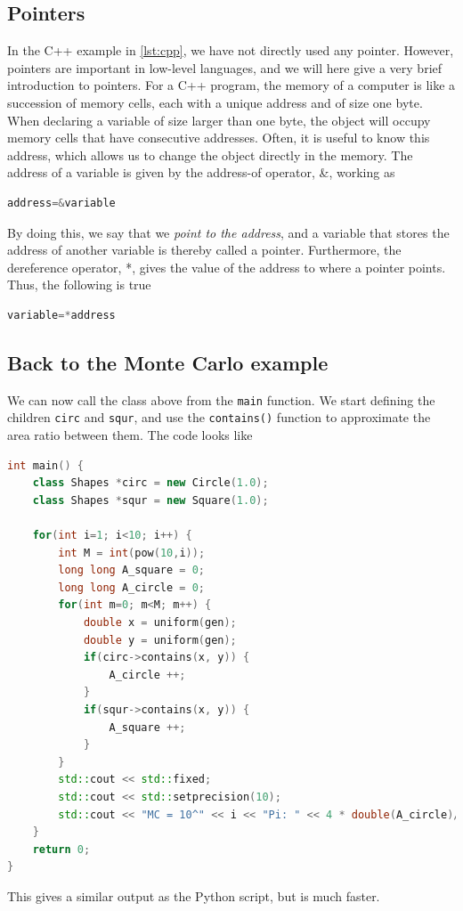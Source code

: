 \subsection{Pointers}
In the C++ example in \eqref{lst:cpp}, we have not directly used any pointer. However, pointers are important in low-level languages, and we will here give a very brief introduction to pointers. For a C++ program, the memory of a computer is like a succession of memory cells, each with a unique address and of size one byte. When declaring a variable of size larger than one byte, the object will occupy memory cells that have consecutive addresses. Often, it is useful to know this address, which allows us to change the object directly in the memory. The address of a variable is given by the address-of operator, \&, working as
\lstset{basicstyle=\scriptsize}
\begin{lstlisting}[language=C++]
address=&variable
\end{lstlisting}
By doing this, we say that we \textit{point to the address}, and a variable that stores the address of another variable is thereby called a pointer. Furthermore, the dereference operator, *, gives the value of the address to where a pointer points. Thus, the following is true
\begin{lstlisting}[language=C++]
variable=*address
\end{lstlisting}

\subsection{Back to the Monte Carlo example}
We can now call the class above from the \texttt{main} function. We start defining the children \texttt{circ} and \texttt{squr}, and use the \texttt{contains()} function to approximate the area ratio between them. The code looks like 
\begin{lstlisting}[language=c++]
int main() {   
	class Shapes *circ = new Circle(1.0);
	class Shapes *squr = new Square(1.0);

	for(int i=1; i<10; i++) {
		int M = int(pow(10,i));
		long long A_square = 0;
		long long A_circle = 0;
		for(int m=0; m<M; m++) {
			double x = uniform(gen);
			double y = uniform(gen);
			if(circ->contains(x, y)) {
				A_circle ++;
			}
			if(squr->contains(x, y)) {
				A_square ++;
			}
		}
		std::cout << std::fixed;
		std::cout << std::setprecision(10);
		std::cout << "MC = 10^" << i << "Pi: " << 4 * double(A_circle)/A_square << std::endl;
	}
	return 0;
}
\end{lstlisting}
This gives a similar output as the Python script, but is much faster.

